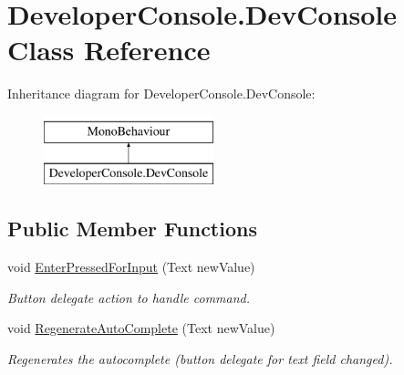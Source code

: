 \hypertarget{class_developer_console_1_1_dev_console}{}\section{Developer\+Console.\+Dev\+Console Class Reference}
\label{class_developer_console_1_1_dev_console}
Inheritance diagram for Developer\+Console.\+Dev\+Console\+:\begin{figure}[H]
\begin{center}
\leavevmode
\includegraphics[height=2.000000cm]{class_developer_console_1_1_dev_console}
\end{center}
\end{figure}
\subsection*{Public Member Functions}
\begin{DoxyCompactItemize}
\item 
void \hyperlink{class_developer_console_1_1_dev_console_af57ec8873f1664aefe8574da21a18e3f}{Enter\+Pressed\+For\+Input} (Text new\+Value)
\begin{DoxyCompactList}\small\item\em Button delegate action to handle command. \end{DoxyCompactList}\item 
void \hyperlink{class_developer_console_1_1_dev_console_aaa079c848c38afe4832fea2a4add51a3}{Regenerate\+Auto\+Complete} (Text new\+Value)
\begin{DoxyCompactList}\small\item\em Regenerates the autocomplete (button delegate for text field changed). \end{DoxyCompactList}\end{DoxyCompactItemize}
